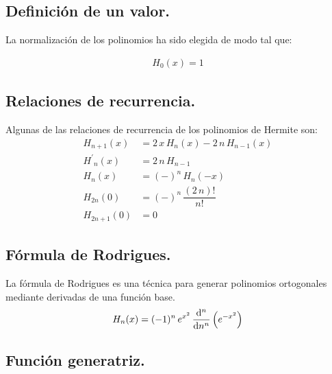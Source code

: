 \documentclass[12pt]{article}
\newcommand{\pderivada}[1]{\ensuremath{{#1}^{\prime}}}
\numberwithin{equation}{section}
\begin{document}
\subsection{Definición de un valor.}

La normalización de los polinomios ha sido elegida de modo tal que:

\begin{align*}
H_{0} (x) = 1
\end{align*}

\subsection{Relaciones de recurrencia.}

Algunas de las relaciones de recurrencia de los polinomios de Hermite son:
\begin{align*}
H_{n+1} (x) &= 2 \, x \, H_{n} (x) - 2 \, n \, H_{n-1} (x) \\ 
\pderivada{H}_{n} (x) &= 2 \, n \, H_{n-1} \\ 
H_{n} (x) &= (-)^{n} \, H_{n} (-x) \\ 
H_{2n} (0) &= (-)^{n} \, \dfrac{(2 \, n)!}{n!} \\ 
H_{2n+1} (0) &= 0
\end{align*}

\subsection{Fórmula de Rodrigues.}

La fórmula de Rodrigues es una técnica para generar polinomios ortogonales mediante derivadas de una función base. 
\begin{align*}
H_{n} (x) = (-1)^{n} \, e^{x^{2}} \, \dv[n]{n} \left( e^{-x^{2}} \right)
\end{align*}

\subsection{Función generatriz.}
\end{document}
